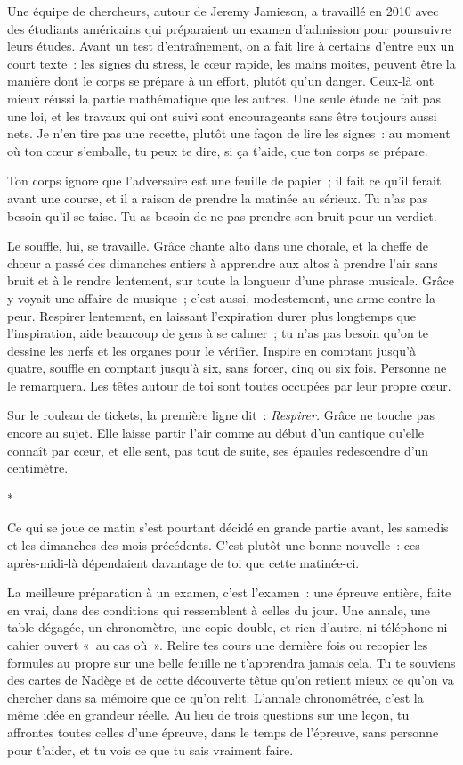 \documentclass[10.5pt,twoside,openright]{book}
\newcommand{\asterisme}{\par\vspace{0.7em}\centerline{\color{gris}*\quad*\quad*}\vspace{0.7em}\par\noindent}
\begin{document}
Une équipe de chercheurs, autour de Jeremy Jamieson, a travaillé en 2010 avec des étudiants américains qui préparaient un examen d’admission pour poursuivre leurs études. Avant un test d’entraînement, on a fait lire à certains d’entre eux un court texte : les signes du stress, le cœur rapide, les mains moites, peuvent être la manière dont le corps se prépare à un effort, plutôt qu’un danger. Ceux-là ont mieux réussi la partie mathématique que les autres. Une seule étude ne fait pas une loi, et les travaux qui ont suivi sont encourageants sans être toujours aussi nets. Je n’en tire pas une recette, plutôt une façon de lire les signes : au moment où ton cœur s’emballe, tu peux te dire, si ça t’aide, que ton corps se prépare.

Ton corps ignore que l’adversaire est une feuille de papier ; il fait ce qu’il ferait avant une course, et il a raison de prendre la matinée au sérieux. Tu n’as pas besoin qu’il se taise. Tu as besoin de ne pas prendre son bruit pour un verdict.

Le souffle, lui, se travaille. Grâce chante alto dans une chorale, et la cheffe de chœur a passé des dimanches entiers à apprendre aux altos à prendre l’air sans bruit et à le rendre lentement, sur toute la longueur d’une phrase musicale. Grâce y voyait une affaire de musique ; c’est aussi, modestement, une arme contre la peur. Respirer lentement, en laissant l’expiration durer plus longtemps que l’inspiration, aide beaucoup de gens à se calmer ; tu n’as pas besoin qu’on te dessine les nerfs et les organes pour le vérifier. Inspire en comptant jusqu’à quatre, souffle en comptant jusqu’à six, sans forcer, cinq ou six fois. Personne ne le remarquera. Les têtes autour de toi sont toutes occupées par leur propre cœur.

Sur le rouleau de tickets, la première ligne dit : \emph{Respirer.} Grâce ne touche pas encore au sujet. Elle laisse partir l’air comme au début d’un cantique qu’elle connaît par cœur, et elle sent, pas tout de suite, ses épaules redescendre d’un centimètre.

\asterisme

Ce qui se joue ce matin s’est pourtant décidé en grande partie avant, les samedis et les dimanches des mois précédents. C’est plutôt une bonne nouvelle : ces après-midi-là dépendaient davantage de toi que cette matinée-ci.

La meilleure préparation à un examen, c’est l’examen : une épreuve entière, faite en vrai, dans des conditions qui ressemblent à celles du jour. Une annale, une table dégagée, un chronomètre, une copie double, et rien d’autre, ni téléphone ni cahier ouvert « au cas où ». Relire tes cours une dernière fois ou recopier les formules au propre sur une belle feuille ne t’apprendra jamais cela. Tu te souviens des cartes de Nadège et de cette découverte têtue qu’on retient mieux ce qu’on va chercher dans sa mémoire que ce qu’on relit. L’annale chronométrée, c’est la même idée en grandeur réelle. Au lieu de trois questions sur une leçon, tu affrontes toutes celles d’une épreuve, dans le temps de l’épreuve, sans personne pour t’aider, et tu vois ce que tu sais vraiment faire.
\end{document}
